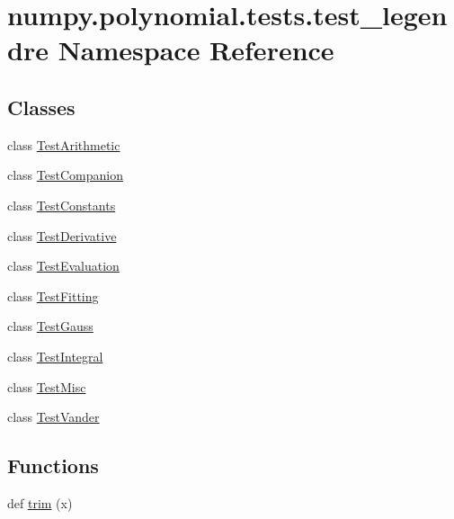 \hypertarget{namespacenumpy_1_1polynomial_1_1tests_1_1test__legendre}{}\section{numpy.\+polynomial.\+tests.\+test\+\_\+legendre Namespace Reference}
\label{namespacenumpy_1_1polynomial_1_1tests_1_1test__legendre}
\subsection*{Classes}
\begin{DoxyCompactItemize}
\item 
class \hyperlink{classnumpy_1_1polynomial_1_1tests_1_1test__legendre_1_1TestArithmetic}{Test\+Arithmetic}
\item 
class \hyperlink{classnumpy_1_1polynomial_1_1tests_1_1test__legendre_1_1TestCompanion}{Test\+Companion}
\item 
class \hyperlink{classnumpy_1_1polynomial_1_1tests_1_1test__legendre_1_1TestConstants}{Test\+Constants}
\item 
class \hyperlink{classnumpy_1_1polynomial_1_1tests_1_1test__legendre_1_1TestDerivative}{Test\+Derivative}
\item 
class \hyperlink{classnumpy_1_1polynomial_1_1tests_1_1test__legendre_1_1TestEvaluation}{Test\+Evaluation}
\item 
class \hyperlink{classnumpy_1_1polynomial_1_1tests_1_1test__legendre_1_1TestFitting}{Test\+Fitting}
\item 
class \hyperlink{classnumpy_1_1polynomial_1_1tests_1_1test__legendre_1_1TestGauss}{Test\+Gauss}
\item 
class \hyperlink{classnumpy_1_1polynomial_1_1tests_1_1test__legendre_1_1TestIntegral}{Test\+Integral}
\item 
class \hyperlink{classnumpy_1_1polynomial_1_1tests_1_1test__legendre_1_1TestMisc}{Test\+Misc}
\item 
class \hyperlink{classnumpy_1_1polynomial_1_1tests_1_1test__legendre_1_1TestVander}{Test\+Vander}
\end{DoxyCompactItemize}
\subsection*{Functions}
\begin{DoxyCompactItemize}
\item 
def \hyperlink{namespacenumpy_1_1polynomial_1_1tests_1_1test__legendre_af377735a2022019187339471418e5066}{trim} (x)
\end{DoxyCompactItemize}
